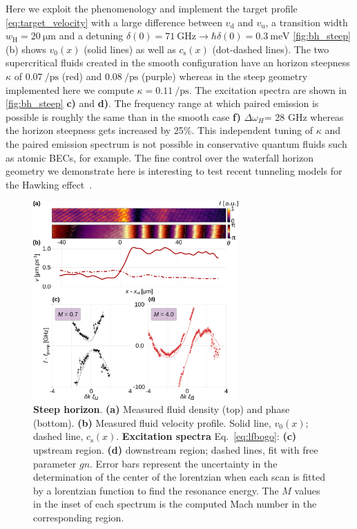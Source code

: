 Here we exploit the phenomenology and implement the target profile \autoref{eq:target_velocity} with a large difference between $v_\mathrm{d}$ and $v_\mathrm{u}$, a transition width $w_\mathrm{H}=\SI{20}{\micro\meter}$ and a detuning $\delta(0)=\SI{71}{\giga\hertz} \rightarrow\hbar\delta(0)=\SI{0.3}{\milli \electronvolt}$
\autoref{fig:bh_steep} (b) shows $v_0(x)$ (solid lines) as well as $c_\mathrm{s}(x)$ (dot-dashed lines). The two supercritical fluids created in the smooth configuration 
have an horizon steepness $\kappa$ of $\SI{0.07}{\per \pico \second}$ (red) and $\SI{0.08}{\per \pico \second}$ (purple) whereas in the steep geometry implemented here we compute $\kappa = \SI{0.11}{\per \pico \second}$. The excitation spectra are shown in \autoref{fig:bh_steep} \textbf{c)} and \textbf{d)}.
The frequency range at which paired emission is possible is roughly the same than in the smooth case \textbf{f)} $\Delta \omega_H$= 28 GHz whereas the horizon steepness 
gets increased by 25\%. This independent tuning of $\kappa$ and the paired emission spectrum is not possible in conservative quantum fluids such as atomic BECs, for example.
The fine control over the waterfall horizon geometry we demonstrate here is interesting to test recent tunneling models for the Hawking effect~\cite{delporro2024tunneling}.


\begin{figure}
    \centering
    \includegraphics[width=0.7\textwidth]{chap3_custom_st/fig/bh_steep.pdf}
    \caption{\textbf{Steep horizon}.    
    \textbf{(a)} Measured fluid density (top) and phase (bottom).
    \textbf{(b)} Measured fluid velocity profile.
    Solid line, $v_0(x)$; dashed line, $c_\mathrm{s}(x)$.
    \textbf{Excitation spectra} Eq.~\eqref{eq:lfbogo}: \textbf{(c)} upstream region. \textbf{(d)} downstream region; dashed lines, fit with free parameter $gn$. Error bars represent the uncertainty in the determination
    of the center of the lorentzian when each scan is fitted by a lorentzian function to find the resonance energy. The $M$ values in the inset of each spectrum is the computed Mach number in the corresponding region. }
    \label{fig:bh_steep}
\end{figure}

